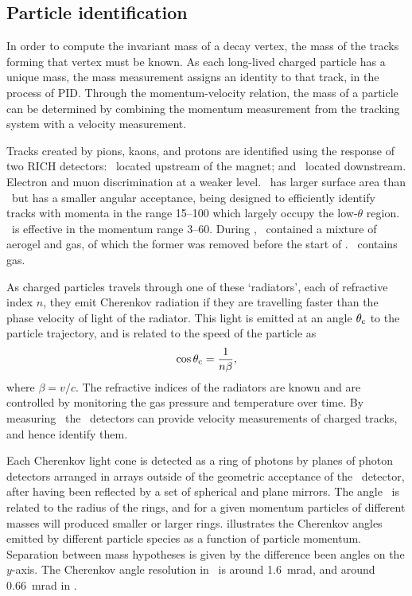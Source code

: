 \subsection{Particle identification}
\label{chap:intro:lhcb:detector:pid}

In order to compute the invariant mass of a decay vertex, the mass of the 
tracks forming that vertex must be known.
As each long-lived charged particle has a unique mass, the mass measurement 
assigns an identity to that track, in the process of \acf{PID}.
Through the momentum-velocity relation, the mass of a particle can be 
determined by combining the momentum measurement from the tracking system with 
a velocity measurement.

Tracks created by pions, kaons, and protons are identified using the response 
of two \acl{RICH} detectors: \richone\ located upstream of the magnet; and 
\richtwo\ located downstream.
Electron and muon discrimination at a weaker level.
\richtwo\ has larger surface area than \richone\ but has a smaller angular 
acceptance, being designed to efficiently identify tracks with momenta in the 
range \SIrange{15}{100}{\GeVc} which largely occupy the low-$\theta$ region.
\richone\ is effective in the momentum range \SIrange{3}{60}{\GeVc}.
During \runone, \richone\ contained a mixture of aerogel and  gas, of 
which the former was removed before the start of \runtwo.
\richtwo\ contains  gas.

As charged particles travels through one of these `radiators', each of 
refractive index $n$, they emit Cherenkov radiation if they are travelling 
faster than the phase velocity of light of the radiator.
This light is emitted at an angle $\theta_{\textnormal{c}}$ to the particle trajectory, and is 
related to the speed of the particle as
\begin{equation}
  \cos{\ensuremath{\theta_{\textnormal{c}}}} = \frac{1}{n\beta},
\end{equation}
where $\beta = v/c$.
The refractive indices of the radiators are known and are controlled by 
monitoring the gas pressure and temperature over time.
By measuring \thetac\ the \rich\ detectors can provide velocity measurements of 
charged tracks, and hence identify them.

Each Cherenkov light cone is detected as a ring of photons by planes of photon 
detectors arranged in arrays outside of the geometric acceptance of the \lhcb\ 
detector, after having been reflected by a set of spherical and plane mirrors.
The angle \thetac\ is related to the radius of the rings, and for a given 
momentum particles of different masses will produced smaller or larger rings.
\Cref{fig:intro:lhcb:cherenkov_angles} illustrates the Cherenkov angles emitted 
by different particle species as a function of particle momentum.
Separation between mass hypotheses is given by the difference been angles on 
the $y$-axis.
The Cherenkov angle resolution in \richone\ is around \SI{1.6}{\milli\radian}, 
and around \SI{0.66}{\milli\radian} in \richtwo.

